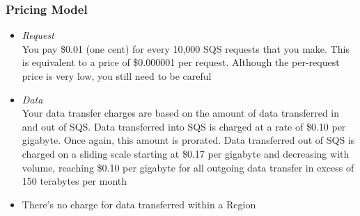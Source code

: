 \documentclass{beamer}
\begin{document}
\begin{frame}
\frametitle{Pricing Model}
\begin{itemize}
\item \emph{Request}\\You pay \$0.01 (one cent) for every 10,000 SQS requests that you make. This is
equivalent to a price of \$0.000001 per request. Although the per-request price is very low, you still need to be careful
\item \emph{Data}\\Your data transfer charges are based on the amount of data transferred in and out
of SQS. Data transferred into SQS is charged at a rate of \$0.10 per gigabyte. Once
again, this amount is prorated. Data transferred out of SQS is charged on a sliding
scale starting at \$0.17 per gigabyte and decreasing with volume, reaching \$0.10 per
gigabyte for all outgoing data transfer in excess of 150 terabytes per month
\item There’s no charge for data transferred within a Region
\end{itemize}
\end{frame}
\end{document}
